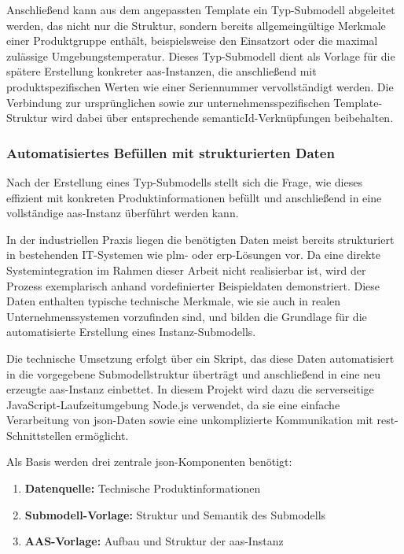 Anschließend kann aus dem angepassten Template ein Typ-Submodell abgeleitet werden, das nicht nur die Struktur, sondern bereits allgemeingültige Merkmale einer Produktgruppe enthält, beispielsweise den Einsatzort oder die maximal zulässige Umgebungstemperatur.
Dieses Typ-Submodell dient als Vorlage für die spätere Erstellung konkreter \acs{aas}-Instanzen, die anschließend mit produktspezifischen Werten wie einer Seriennummer vervollständigt werden.
Die Verbindung zur ursprünglichen sowie zur unternehmensspezifischen Template-Struktur wird dabei über entsprechende semanticId-Verknüpfungen beibehalten.


\subsubsection{Automatisiertes Befüllen mit strukturierten Daten}
Nach der Erstellung eines Typ-Submodells stellt sich die Frage, wie dieses effizient mit konkreten Produktinformationen befüllt und anschließend in eine vollständige \acs{aas}-Instanz überführt werden kann.

In der industriellen Praxis liegen die benötigten Daten meist bereits strukturiert in bestehenden IT-Systemen wie \acs{plm}- oder \acs{erp}-Lösungen vor.
Da eine direkte Systemintegration im Rahmen dieser Arbeit nicht realisierbar ist, wird der Prozess exemplarisch anhand vordefinierter Beispieldaten demonstriert.
Diese Daten enthalten typische technische Merkmale, wie sie auch in realen Unternehmenssystemen vorzufinden sind, und bilden die Grundlage für die automatisierte Erstellung eines Instanz-Submodells.

Die technische Umsetzung erfolgt über ein Skript, das diese Daten automatisiert in die vorgegebene Submodellstruktur überträgt und anschließend in eine neu erzeugte \acs{aas}-Instanz einbettet.
In diesem Projekt wird dazu die serverseitige JavaScript-Laufzeitumgebung Node.js \cite{nodejs} verwendet, da sie eine einfache Verarbeitung von \acs{json}-Daten sowie eine unkomplizierte Kommunikation mit \acs{rest}-Schnittstellen ermöglicht. 

Als Basis werden drei zentrale \acs{json}-Komponenten benötigt:

\begin{enumerate}[noitemsep, leftmargin=*, label=\textbf{\arabic*.}]
    \item \textbf{Datenquelle:} Technische Produktinformationen
    \item \textbf{Submodell-Vorlage:} Struktur und Semantik des Submodells
    \item \textbf{AAS-Vorlage:} Aufbau und Struktur der \acs{aas}-Instanz
\end{enumerate}

